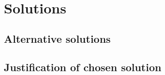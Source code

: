 \section{Solutions}

\subsection{Alternative solutions}

\subsection{Justification of chosen solution}

